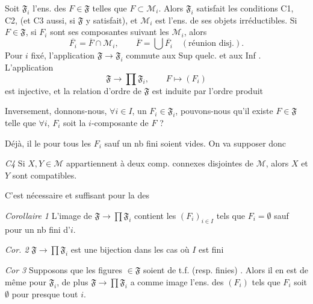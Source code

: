 \documentclass[11pt,a4paper]{article}
\begin{document}
 Soit $\mathfrak{F}_i$ l'ens. des $F \in \mathfrak{F}$ telles que $F \subset \mathcal{M}_i$. Alors \struck{\ill{}} $\mathfrak{F}_i$ satisfait les conditions C1, C2, \struck{\ill{}} (et C3 aussi, si $\mathfrak{F}$ y satisfait), et $\mathcal{M}_i$ est l'ens. de ses objets irréductibles.  Si $F \in \mathfrak{F}$, si $F_i$ sont ses composantes suivant les $\mathcal{M}_i$,  alors
\[
  \overline{F_i} = \overline{F} \cap \mathcal{M}_i , \qquad \overline{F} = \bigcup \overline{F_i} \quad (\text{réunion disj.}) .
\]
Pour $i$ fixé, l'application $\mathfrak{F} \to \mathfrak{F}_i$ commute aux Sup quelc. et aux Inf . L'application
\[
  \mathfrak{F} \to \prod \mathfrak{F}_i , \qquad F \mapsto (F_i)
\]
est injective, et la relation d'ordre de $\mathfrak{F}$ est induite par l'ordre produit

Inversement, donnons-nous,  $\forall i \in I$, un $F_i \in \mathfrak{F}_i$, pouvons-nous  qu'il existe $F \in \mathfrak{F}$ telle que $\forall i$, $F_i$ soit la $i$-composante de $F$ ?

Déjà, il le  pour \struck{\ill{}}  tous les $F_i$ sauf un nb fini soient \struck{$\emptyset$} vides. On va supposer donc

\emph{C4} \quad Si $X, Y \in \mathcal{M}$ appartiennent à deux comp. connexes disjointes de $\mathcal{M}$, alors $X$ et $Y$ sont compatibles.

C'est nécessaire et suffisant pour la \ill{} des \ill{}


\emph{Corollaire 1} \quad L'image de $\mathfrak{F} \to \prod \mathfrak{F}_i$ contient les $(F_i)_{i \in I}$ tels que $F_i = \emptyset$ sauf pour \struck{\ill{}} un nb fini d'$i$.

\emph{Cor. 2} \quad {} $\mathfrak{F} \to \prod \mathfrak{F}_i$ est une bijection dans les  cas où $I$ est fini 

\emph{Cor 3} \quad Supposons que les figures \struck{\ill{}} $\in \mathfrak{F}$ soient de t.f. (resp. finies) \struck{\ill{}}. Alors il en est de même pour $\mathfrak{F}_i$, de plus $\mathfrak{F} \to \prod \mathfrak{F}_i$ a comme image l'ens. des $(F_i)$ tels que $F_i$ soit $\emptyset$ pour presque tout $i$.
\end{document}
